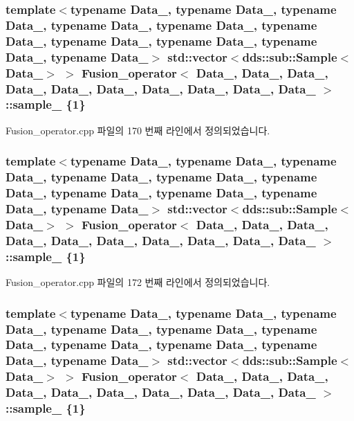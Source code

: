 \subsubsection[{\texorpdfstring{sample\+\_\+5}{sample_5}}]{\setlength{\rightskip}{0pt plus 5cm}template$<$typename Data\+\_, typename Data\+\_, typename Data\+\_, typename Data\+\_, typename Data\+\_, typename Data\+\_, typename Data\+\_, typename Data\+\_, typename Data\+\_, typename Data\+\_$>$ std\+::vector$<$dds\+::sub\+::\+Sample$<$Data\+\_$>$ $>$ {\bf Fusion\+\_\+operator}$<$ Data\+\_, Data\+\_, Data\+\_, Data\+\_, Data\+\_, Data\+\_, Data\+\_, Data\+\_, Data\+\_, Data\+\_ $>$\+::sample\+\_ \{1\}}\hypertarget{classFusion__operator_a5623c0acc7a90d21a50ac010a5f1daf5}{}\label{classFusion__operator_a5623c0acc7a90d21a50ac010a5f1daf5}


Fusion\+\_\+operator.\+cpp 파일의 170 번째 라인에서 정의되었습니다.

\subsubsection[{\texorpdfstring{sample\+\_\+6}{sample_6}}]{\setlength{\rightskip}{0pt plus 5cm}template$<$typename Data\+\_, typename Data\+\_, typename Data\+\_, typename Data\+\_, typename Data\+\_, typename Data\+\_, typename Data\+\_, typename Data\+\_, typename Data\+\_, typename Data\+\_$>$ std\+::vector$<$dds\+::sub\+::\+Sample$<$Data\+\_$>$ $>$ {\bf Fusion\+\_\+operator}$<$ Data\+\_, Data\+\_, Data\+\_, Data\+\_, Data\+\_, Data\+\_, Data\+\_, Data\+\_, Data\+\_, Data\+\_ $>$\+::sample\+\_ \{1\}}\hypertarget{classFusion__operator_a0051d8d0ba3e16b797e38412e44f46ef}{}\label{classFusion__operator_a0051d8d0ba3e16b797e38412e44f46ef}


Fusion\+\_\+operator.\+cpp 파일의 172 번째 라인에서 정의되었습니다.

\subsubsection[{\texorpdfstring{sample\+\_\+7}{sample_7}}]{\setlength{\rightskip}{0pt plus 5cm}template$<$typename Data\+\_, typename Data\+\_, typename Data\+\_, typename Data\+\_, typename Data\+\_, typename Data\+\_, typename Data\+\_, typename Data\+\_, typename Data\+\_, typename Data\+\_$>$ std\+::vector$<$dds\+::sub\+::\+Sample$<$Data\+\_$>$ $>$ {\bf Fusion\+\_\+operator}$<$ Data\+\_, Data\+\_, Data\+\_, Data\+\_, Data\+\_, Data\+\_, Data\+\_, Data\+\_, Data\+\_, Data\+\_ $>$\+::sample\+\_ \{1\}}\hypertarget{classFusion__operator_ac206ae8fc1c89e2ca114bb80a5899bcd}{}\label{classFusion__operator_ac206ae8fc1c89e2ca114bb80a5899bcd}


